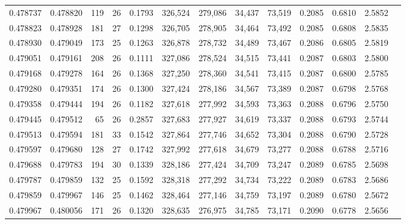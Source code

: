 \begin{tabular}{rrrrrrrrrrrrr}
0.478737 & 0.478820 & 119 &  26 &                                     0.1793 & 326,524 & 279,086 &  34,437 &  73,519 & 0.2085 & 0.6810 & 2.5852 \\
0.478823 & 0.478928 & 181 &  27 &                                     0.1298 & 326,705 & 278,905 &  34,464 &  73,492 & 0.2085 & 0.6808 & 2.5835 \\
0.478930 & 0.479049 & 173 &  25 &                                     0.1263 & 326,878 & 278,732 &  34,489 &  73,467 & 0.2086 & 0.6805 & 2.5819 \\
0.479051 & 0.479161 & 208 &  26 &                                     0.1111 & 327,086 & 278,524 &  34,515 &  73,441 & 0.2087 & 0.6803 & 2.5800 \\
0.479168 & 0.479278 & 164 &  26 &                                     0.1368 & 327,250 & 278,360 &  34,541 &  73,415 & 0.2087 & 0.6800 & 2.5785 \\
0.479280 & 0.479351 & 174 &  26 &                                     0.1300 & 327,424 & 278,186 &  34,567 &  73,389 & 0.2087 & 0.6798 & 2.5768 \\
0.479358 & 0.479444 & 194 &  26 &                                     0.1182 & 327,618 & 277,992 &  34,593 &  73,363 & 0.2088 & 0.6796 & 2.5750 \\
0.479445 & 0.479512 &  65 &  26 &                                     0.2857 & 327,683 & 277,927 &  34,619 &  73,337 & 0.2088 & 0.6793 & 2.5744 \\
0.479513 & 0.479594 & 181 &  33 &                                     0.1542 & 327,864 & 277,746 &  34,652 &  73,304 & 0.2088 & 0.6790 & 2.5728 \\
0.479597 & 0.479680 & 128 &  27 &                                     0.1742 & 327,992 & 277,618 &  34,679 &  73,277 & 0.2088 & 0.6788 & 2.5716 \\
0.479688 & 0.479783 & 194 &  30 &                                     0.1339 & 328,186 & 277,424 &  34,709 &  73,247 & 0.2089 & 0.6785 & 2.5698 \\
0.479787 & 0.479859 & 132 &  25 &                                     0.1592 & 328,318 & 277,292 &  34,734 &  73,222 & 0.2089 & 0.6783 & 2.5686 \\
0.479859 & 0.479967 & 146 &  25 &                                     0.1462 & 328,464 & 277,146 &  34,759 &  73,197 & 0.2089 & 0.6780 & 2.5672 \\
0.479967 & 0.480056 & 171 &  26 &                                     0.1320 & 328,635 & 276,975 &  34,785 &  73,171 & 0.2090 & 0.6778 & 2.5656 \\

\end{tabular}
